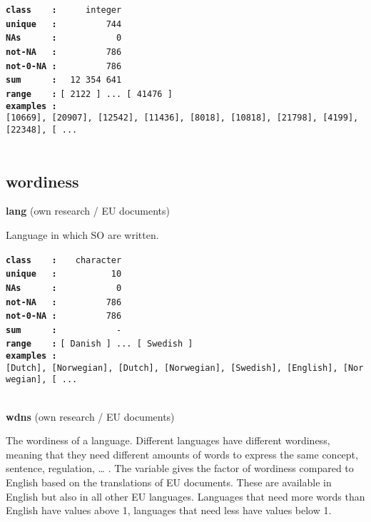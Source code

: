 \documentclass[]{article}
\begin{document}
\textbf{\texttt{class\ \ \ \ :}} \texttt{~~~~~integer}\\
\textbf{\texttt{unique\ \ \ :}} \texttt{~~~~~~~~~744}\\
\textbf{\texttt{NAs\ \ \ \ \ \ :}} \texttt{~~~~~~~~~~~0}\\
\textbf{\texttt{not-NA\ \ \ :}} \texttt{~~~~~~~~~786}\\
\textbf{\texttt{not-0-NA\ :}} \texttt{~~~~~~~~~786}\\
\textbf{\texttt{sum\ \ \ \ \ \ :}} \texttt{~~12~354~641}\\
\textbf{\texttt{range\ \ \ \ :}}
\texttt{{[}\ 2122\ {]}\ ...\ {[}\ 41476\ {]}}\\
\textbf{\texttt{examples\ :}}
\texttt{{[}10669{]},\ {[}20907{]},\ {[}12542{]},\ {[}11436{]},\ {[}8018{]},\ {[}10818{]},\ {[}21798{]},\ {[}4199{]},\ {[}22348{]},\ {[}\ ...}\\

~

\subsection{wordiness}\label{wordiness}

\textbf{lang} (own research / EU documents)

Language in which SO are written.

\textbf{\texttt{class\ \ \ \ :}} \texttt{~~~character}\\
\textbf{\texttt{unique\ \ \ :}} \texttt{~~~~~~~~~~10}\\
\textbf{\texttt{NAs\ \ \ \ \ \ :}} \texttt{~~~~~~~~~~~0}\\
\textbf{\texttt{not-NA\ \ \ :}} \texttt{~~~~~~~~~786}\\
\textbf{\texttt{not-0-NA\ :}} \texttt{~~~~~~~~~786}\\
\textbf{\texttt{sum\ \ \ \ \ \ :}} \texttt{~~~~~~~~~~~-}\\
\textbf{\texttt{range\ \ \ \ :}}
\texttt{{[}\ Danish\ {]}\ ...\ {[}\ Swedish\ {]}}\\
\textbf{\texttt{examples\ :}}
\texttt{{[}Dutch{]},\ {[}Norwegian{]},\ {[}Dutch{]},\ {[}Norwegian{]},\ {[}Swedish{]},\ {[}English{]},\ {[}Norwegian{]},\ {[}\ ...}\\

~

\textbf{wdns} (own research / EU documents)

The wordiness of a language. Different languages have different
wordiness, meaning that they need different amounts of words to express
the same concept, sentence, regulation, \ldots{} . The variable gives
the factor of wordiness compared to English based on the translations of
EU documents. These are available in English but also in all other EU
languages. Languages that need more words than English have values above
1, languages that need less have values below 1.
\end{document}
